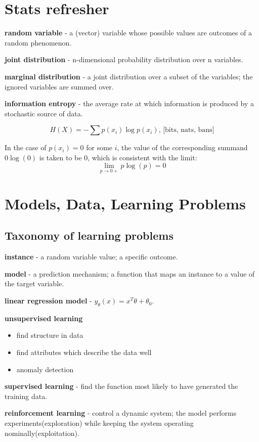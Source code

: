 \documentclass{article}
\newcommand{\para}[0]{\par\vspace{0.2cm}\noindent}
\newcommand{\define}[2]{\textbf{#1} - {#2}.  \para}
\begin{document}
\section{Stats refresher}
\define{random variable}
           {a (vector) variable whose possible values are outcomes of a random phenomenon}
\define{joint distribution}
           {n-dimensional probability distribution over n variables}
\define{marginal distribution}
           {a joint distribution over a subset of the variables; the ignored variables are summed over}
\define{information entropy}
           {the average rate at which information is produced by a stochastic source of data}
$$ H(X) = - \sum p(x_i) \log p(x_i) \text{,  [bits, nats, bans]}$$
\para
In the case of $p(x_i) = 0$ for some $i$, the value of the corresponding summand $0 \log(0)$ is taken to be 0, which is consistent with the limit:
$$ \lim_{p \to 0+} p \log(p) = 0$$

\section{Models, Data, Learning Problems}
\subsection{Taxonomy of learning problems}
\define{instance}
           {a random variable value; a specific outcome}
\define{model}
           {a prediction mechanism; a function that maps an instance to a value of the target variable}
\define{linear regression model}
           {$y_\theta(x) = x^T \theta + \theta_0$}
\textbf{unsupervised learning}
           \begin{itemize}
                \item{find structure in data}
                \item{find attributes which describe the data well}
                \item{anomaly detection}
           \end{itemize}
\para
\define{supervised learning}
           {find the function most likely to have generated the training data}
\define{reinforcement learning}
           {control a dynamic system; the model performs experiments(exploration) while keeping the system operating nominally(exploitation)}
\end{document}

